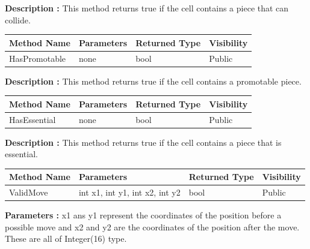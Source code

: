 \documentclass[12pt]{article}
\begin{document}
\textbf{Description :} This method returns true if the cell contains a piece that can collide.

\begin{table}[H]
    \begin{tabular}{|l|l|l|l|}
    \hline
    \rowcolor[HTML]{EFEFEF} 
    \cellcolor[HTML]{EFEFEF}\textbf{Method Name} & \textbf{Parameters}     & \textbf{Returned Type} & \textbf{Visibility} \\ \hline
    HasPromotable                                & none                    & bool                   & Public              \\ \hline
    \end{tabular}
\end{table}

\textbf{Description :} This method returns true if the cell contains a promotable piece.

\begin{table}[H]
    \begin{tabular}{|l|l|l|l|}
    \hline
    \rowcolor[HTML]{EFEFEF} 
    \cellcolor[HTML]{EFEFEF}\textbf{Method Name} & \textbf{Parameters}     & \textbf{Returned Type} & \textbf{Visibility} \\ \hline
    HasEssential                                 & none                    & bool                   & Public              \\ \hline
    \end{tabular}
\end{table}

\textbf{Description :} This method returns true if the cell contains a piece that is essential.

\begin{table}[H]
    \begin{tabular}{|l|l|l|l|}
    \hline
    \rowcolor[HTML]{EFEFEF} 
    \cellcolor[HTML]{EFEFEF}\textbf{Method Name} & \textbf{Parameters}            & \textbf{Returned Type} & \textbf{Visibility} \\ \hline
    ValidMove                                    & int x1, int y1, int x2, int y2 & bool                   & Public              \\ \hline
    \end{tabular}
\end{table}

\textbf{Parameters :} x1 ans y1 represent the coordinates of the position before a possible move
and x2 and y2 are the coordinates of the position after the move. These are all of Integer(16) type.
\\
\end{document}
